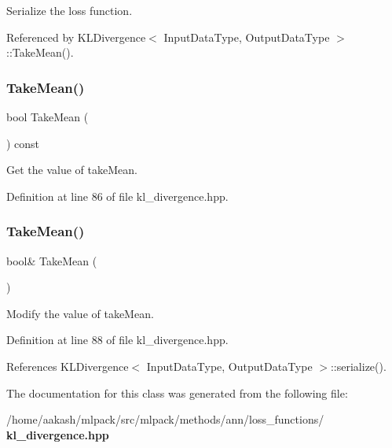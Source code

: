 Serialize the loss function. 



Referenced by K\+L\+Divergence$<$ Input\+Data\+Type, Output\+Data\+Type $>$\+::\+Take\+Mean().

\mbox{\label{classmlpack_1_1ann_1_1KLDivergence_ab1afafdad2b04d3378dce6f13c9968a2}} 
\subsubsection{Take\+Mean()\hspace{0.1cm}{\footnotesize\ttfamily [1/2]}}
{\footnotesize\ttfamily bool Take\+Mean (\begin{DoxyParamCaption}{ }\end{DoxyParamCaption}) const\hspace{0.3cm}{\ttfamily [inline]}}



Get the value of take\+Mean. 



Definition at line 86 of file kl\+\_\+divergence.\+hpp.

\mbox{\label{classmlpack_1_1ann_1_1KLDivergence_a6523d960bcd088ba1e86fbe2e095a79b}} 
\subsubsection{Take\+Mean()\hspace{0.1cm}{\footnotesize\ttfamily [2/2]}}
{\footnotesize\ttfamily bool\& Take\+Mean (\begin{DoxyParamCaption}{ }\end{DoxyParamCaption})\hspace{0.3cm}{\ttfamily [inline]}}



Modify the value of take\+Mean. 



Definition at line 88 of file kl\+\_\+divergence.\+hpp.



References K\+L\+Divergence$<$ Input\+Data\+Type, Output\+Data\+Type $>$\+::serialize().



The documentation for this class was generated from the following file\+:\begin{DoxyCompactItemize}
\item 
/home/aakash/mlpack/src/mlpack/methods/ann/loss\+\_\+functions/\textbf{ kl\+\_\+divergence.\+hpp}\end{DoxyCompactItemize}

